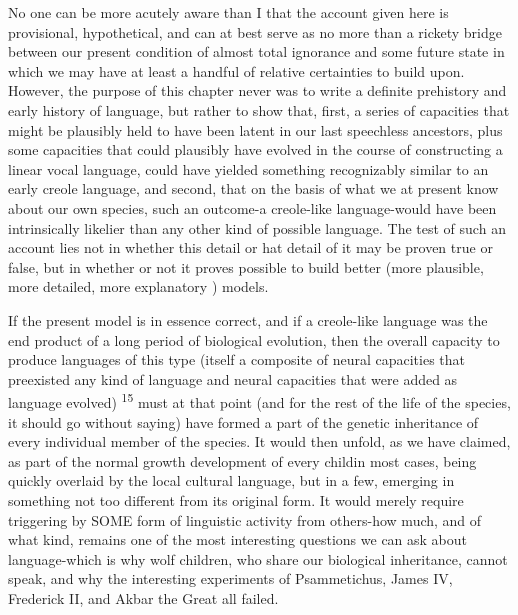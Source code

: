 No one can be more acutely aware than I that the account given here is provisional, hypothetical, and can at best serve as no more than a rickety bridge between our present condition of almost total ignor\-ance and some future state in which we may have at least a handful of relative certainties to build upon. However, the purpose of this chapter never was to write a definite prehistory and early history of language, but rather to show that, first, a series of capacities that might be plausibly held to have been latent in our last speechless ancestors, plus some capacities that could plausibly have evolved in the course of constructing a linear vocal language, could have yielded something recognizably similar to an early creole language, and second, that on the basis of what we at present know about our own species, such an outcome-a creole-like language-would have been intrinsically likelier than any other kind of possible language. The test of such an account lies not in whether this detail or hat detail of it may be proven true
or false, but in whether or not it proves possible to build better (more plausible, more detailed, more explanatory ) models.

If the present model is in essence correct, and if a creole-like language was the end product of a long period of biological evolution, then the overall capacity to produce languages of this type (itself a composite of neural capacities that preexisted any kind of language and neural capacities that were added as language evolved) \textsuperscript{1}\textsuperscript{5} must at that point (and for the rest of the life of the species, it should go without saying) have formed a part of the genetic inheritance of every individual member of the species. It would then unfold, as we have claimed, as part of the normal growth development of every child\-in most cases, being quickly overlaid by the local cultural language, but in a few, emerging in something not too different from its original form. It would merely require triggering by SOME form of linguistic activity from others-how much, and of what kind, remains one of the most interesting questions we can ask about language-which is why wolf children, who share our biological inheritance, cannot speak, and why the interesting experiments of Psammetichus, James IV, Frederick II, and Akbar the Great all failed.

